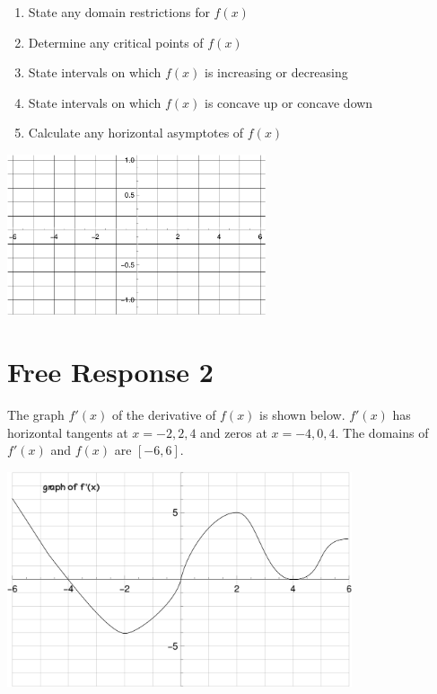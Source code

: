 \documentclass{article}
\begin{document}
\begin{enumerate}
	\setlength{\itemsep}{0.65in}
	\item State any domain restrictions for $f(x)$
	\item Determine any critical points of $f(x)$
	\item State intervals on which $f(x)$ is increasing or decreasing
	\item State intervals on which $f(x)$ is concave up or concave down
	\item Calculate any horizontal asymptotes of $f(x)$
\end{enumerate}
\vspace{0.5in}
\begin{center}
\includegraphics*[width=3in]{media/grid.png}
\end{center}

\clearpage
\section{Free Response 2}

The graph $f'(x)$  of the derivative of $f(x)$ is shown below. $f'(x)$ has horizontal tangents at $x=-2,2,4$ and zeros at $x=-4,0,4$.
The domains of $f'(x)$ and $f(x)$ are $[-6,6]$.

\begin{center}
	\includegraphics[width=4in]{media/g.png}
\end{center}
\end{document}
